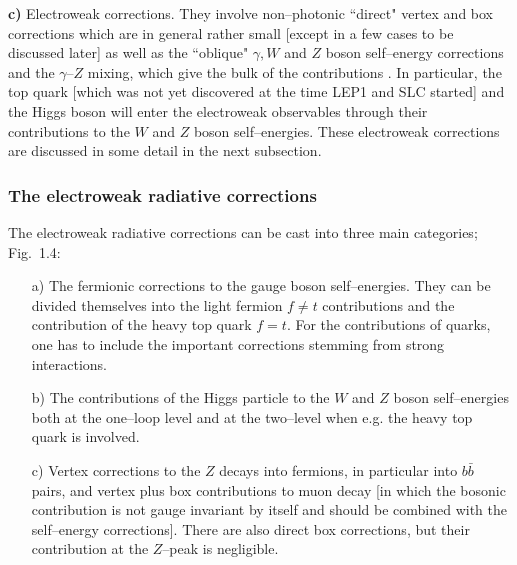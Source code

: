 {\bf c)} Electroweak corrections. They involve non--photonic ``direct" vertex
and box corrections which are in general rather small [except in a few cases to
be discussed later] as well as the ``oblique" $\gamma, W$ and $Z$ boson
self--energy corrections and the $\gamma$--$Z$ mixing, which give the bulk of
the contributions \cite{Z-Physics3,Z-Physics-H}. In particular, the top quark
[which was not yet discovered at the time LEP1 and SLC started] and the Higgs
boson will enter the electroweak observables through  their  contributions to
the $W$ and $Z$ boson self--energies. These electroweak corrections are
discussed in some detail in the next subsection.  

\subsubsection{The electroweak radiative corrections}

The electroweak radiative corrections can be cast into three main categories; 
Fig.~1.4:

\begin{itemize} 
\vspace*{-3mm}

\item[a)] The fermionic corrections to the gauge boson self--energies. They can
be divided themselves into the light fermion $f\neq t$ contributions and the 
contribution of the heavy top quark $f=t$. For the contributions of quarks, one
has to include the important corrections stemming from strong interactions.  
\vspace*{-2mm}

\item[b)] The contributions of the Higgs particle to the $W$ and $Z$ boson
self--energies both at the one--loop level and at the two--level when e.g. the
heavy top quark is involved. 
\vspace*{-2mm}

\item[c)] Vertex corrections to the $Z$ decays into fermions, in particular
into $b\bar{b}$ pairs, and vertex plus box contributions to muon decay [in 
which the bosonic contribution is not gauge invariant by itself and should be 
combined with the self--energy corrections]. There are also direct box 
corrections, but their contribution at the $Z$--peak is negligible. 
\end{itemize}

